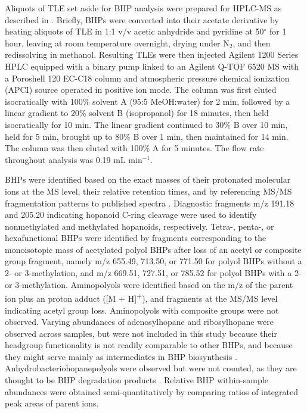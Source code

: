 Aliquots of TLE set aside for BHP analysis were prepared for HPLC-MS as described in \cite{talbot2003atmospheric}. Briefly, BHPs were converted into their acetate derivative by heating aliquots of TLE in 1:1 v/v acetic anhydride and pyridine at 50$^{\circ}$ for 1 hour, leaving at room temperature overnight, drying under N$_2$, and then redissolving in methanol. Resulting TLEs were then injected Agilent 1200 Series HPLC equipped with a binary pump linked to an Agilent Q-TOF 6520 MS with a Poroshell 120 EC-C18 column and atmospheric pressure chemical ionization (APCI) source operated in positive ion mode. The column was first eluted isocratically with 100\% solvent A (95:5 MeOH:water) for 2 min, followed by a linear gradient to 20\% solvent B (isopropanol) for 18 minutes, then held isocratically for 10 min. The linear gradient continued to 30\% B over 10 min, held for 5 min, brought up to 80\% B over 1 min, then maintained for 14 min. The column was then eluted with 100\% A for 5 minutes. The flow rate throughout analysis was 0.19 mL min$^{-1}$.

BHPs were identified based on the exact masses of their protonated molecular ions at the MS level, their relative retention times, and by referencing MS/MS fragmentation patterns to published spectra \citep{talbot2005bacteriohopanepolyols, talbot2007rapid, talbot2007structural, talbot2003atmospheric, talbot2003characteristic, talbot2008cyanobacterial}. Diagnostic fragments m/z 191.18 and 205.20 indicating hopanoid C-ring cleavage were used to identify nonmethylated and methylated hopanoids, respectively. Tetra-, penta-, or hexafunctional BHPs were identified by fragments corresponding to the monoisotopic mass of acetylated polyol BHPs after loss of an acetyl or composite group fragment, namely m/z 655.49, 713.50, or 771.50 for polyol BHPs without a 2- or 3-methylation, and m/z 669.51, 727.51, or 785.52 for polyol BHPs with a 2- or 3-methylation. Aminopolyols were identified based on the m/z of the parent ion plus an proton adduct ([M + H]\textsuperscript{+}), and fragments at the MS/MS level indicating acetyl group loss. Aminopolyols with composite groups were not observed. Varying abundances of adenosylhopane and ribosylhopane were observed across samples, but were not included in this study because their headgroup functionality is not readily comparable to other BHPs, and because they might serve mainly as intermediates in BHP biosynthesis \citep{bradley2010adenosylhopane, liu2014ribosylhopane}. Anhydrobacteriohopanepolyols were observed but were not counted, as they are thought to be BHP degradation products \citep{talbot2005bacteriohopanepolyols, schaeffer2008acid}. Relative BHP within-sample abundances were obtained semi-quantitatively by comparing ratios of integrated peak areas of parent ions.



